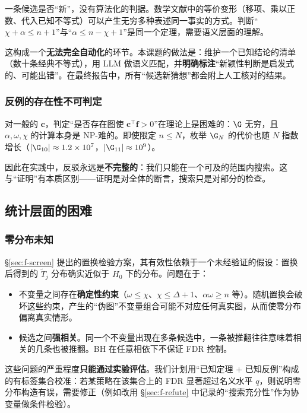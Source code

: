 一条候选是否“新”，没有算法化的判据。数学文献中的等价变形（移项、乘以正数、代入已知不等式）可以产生无穷多种表述同一事实的方式。判断“$\chi+\alpha\le n+1$”与“$\alpha\le n-\chi+1$”是同一个定理，需要语义层面的理解。

这构成一个\textbf{无法完全自动化}的环节。本课题的做法是：维护一个已知结论的清单（数十条经典不等式），用 LLM 做语义匹配，并\textbf{明确标注}“新颖性判断是启发式的、可能出错”。在最终报告中，所有“候选新猜想”都会附上人工核对的结果。

\subsubsection{反例的存在性不可判定}

对一般的 $\bm{c}$，判定“是否存在图使 $\bm{c}^\top\bm{f}>0$”在理论上是困难的：$\G$ 无穷，且 $\alpha,\omega,\chi$ 的计算本身是 NP-难的。即使限定 $n\le N$，枚举 $\G_N$ 的代价也随 $N$ 指数增长（$|\G_{10}|\approx1.2\times10^7$，$|\G_{11}|\approx10^9$）。

因此在实践中，反驳永远是\textbf{不完整的}：我们只能在一个可及的范围内搜索。这与“证明”有本质区别——证明是对全体的断言，搜索只是对部分的检查。

\subsection{统计层面的困难}
\label{sec:hard-stat}

\subsubsection{零分布未知}

\S\ref{sec:f-screen} 提出的置换检验方案，其有效性依赖于一个未经验证的假设：置换后得到的 $\tilde{T}_j$ 分布确实近似于 $H_0$ 下的分布。问题在于：

\begin{itemize}
  \item 不变量之间存在\textbf{确定性约束}（$\omega\le\chi$、$\chi\le\Delta+1$、$\alpha\omega\ge n$ 等）。随机置换会破坏这些约束，产生的“伪图”不变量组合可能不对应任何真实图，从而使零分布偏离真实情形。
  \item 候选之间\textbf{强相关}。同一个不变量出现在多条候选中，一条被推翻往往意味着相关的几条也被推翻。BH 在任意相依下不保证 FDR 控制。
\end{itemize}

这些问题的严重程度\textbf{只能通过实验评估}。我们计划用“已知定理 + 已知反例”构成的有标签集合校准：若某策略在该集合上的 FDR 显著超过名义水平 $q$，则说明零分布构造有误，需要修正（例如改用 \S\ref{sec:f-refute} 中记录的“搜索充分性”作为协变量做条件检验）。

